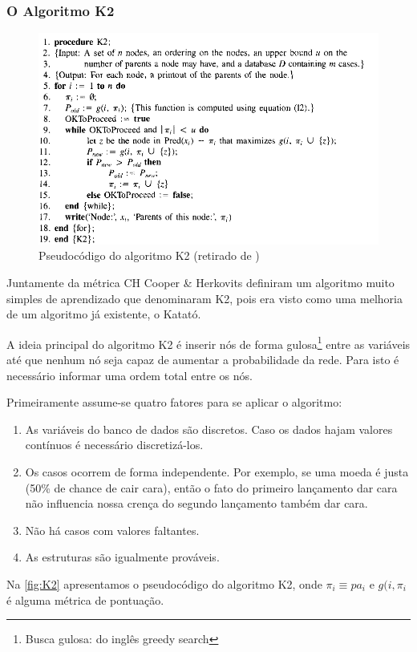 \subsubsection{O Algoritmo K2}
\begin{figure}[htb]
	\centering
	\includegraphics[width = 450px]{figuras/K2}
	\caption{Pseudocódigo do algoritmo K2 (retirado de \cite{cooper92})}
	\label{fig:K2}
\end{figure}
Juntamente da métrica CH Cooper \& Herkovits \cite{cooper92} definiram um algoritmo muito simples de aprendizado que denominaram K2, pois era visto como uma melhoria de um algoritmo já existente, o Katató.

A ideia principal do algoritmo K2 é inserir nós de forma gulosa\footnote{Busca gulosa: do inglês greedy search} entre as variáveis até que nenhum nó seja capaz de aumentar a probabilidade da rede. Para isto é necessário informar uma ordem total entre os nós.

Primeiramente assume-se quatro fatores para se aplicar o algoritmo:

\begin{enumerate}
	\item As variáveis do banco de dados são discretos. Caso os dados hajam valores contínuos é necessário discretizá-los. 
	
	\item Os casos ocorrem de forma independente. Por exemplo, se uma moeda é justa (50\% de chance de cair cara), então o fato do primeiro lançamento dar cara não influencia nossa crença do segundo lançamento também dar cara.
	
	\item Não há casos com valores faltantes.
	
	\item As estruturas são igualmente prováveis.
	
\end{enumerate}
Na \autoref{fig:K2} apresentamos o pseudocódigo do algoritmo K2, onde $\pi_i \equiv pa_i$  e $g(i, \pi_i$ é alguma métrica de pontuação.


